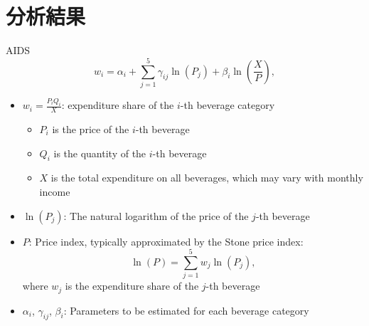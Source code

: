 \documentclass[12pt]{beamer}
\begin{document}
\section{分析結果}


\begin{frame}{AIDS}
\[
	w_i = \alpha_i + \sum_{j=1}^{5} \gamma_{ij} \ln(P_j) + \beta_i \ln\left(\frac{X}{P}\right),
\]
\begin{itemize}
	\item $w_i = \frac{P_i Q_i}{X}$: expenditure share of the $i$-th beverage category
	\begin{itemize}
		\item $P_i$ is the price of the $i$-th beverage
		\item $Q_i$ is the quantity of the $i$-th beverage
		\item $X$ is the total expenditure on all beverages, which may vary with monthly income
	\end{itemize}
	\item $\ln(P_j)$: The natural logarithm of the price of the $j$-th beverage
	\item $P$: Price index, typically approximated by the Stone price index:
	\begin{equation*}
	\ln(P) = \sum_{j=1}^{5} w_j \ln(P_j),
	\end{equation*}
	where $w_j$ is the expenditure share of the $j$-th beverage
	\item $\alpha_i$, $\gamma_{ij}$, $\beta_i$: Parameters to be estimated for each beverage category
\end{itemize}
\end{frame}
\end{document}
